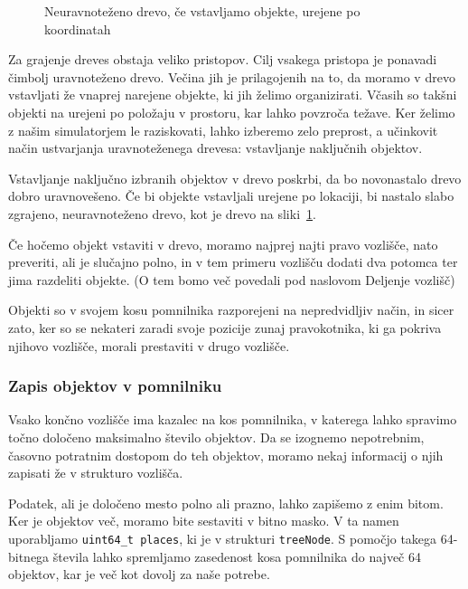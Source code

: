 \documentclass[a4paper,12pt]{article}
\begin{document}
\begin{figure}
    \centering
    
    \caption{Neuravnoteženo drevo, če vstavljamo objekte, urejene po koordinatah}%
    \label{fig:drevo_unbal}
\end{figure}

Za grajenje dreves obstaja veliko pristopov. Cilj vsakega pristopa je ponavadi čimbolj
uravnoteženo drevo. Večina jih je prilagojenih na to, da moramo v drevo vstavljati že vnaprej
narejene objekte, ki jih želimo organizirati. Včasih so takšni objekti na urejeni po položaju v prostoru,
kar lahko povzroča težave. Ker želimo z našim simulatorjem le raziskovati, lahko izberemo zelo 
preprost, a učinkovit način ustvarjanja uravnoteženega drevesa: vstavljanje naključnih objektov.

Vstavljanje naključno izbranih objektov v drevo poskrbi, da bo novonastalo drevo dobro uravnovešeno.
Če bi objekte vstavljali urejene po lokaciji, bi nastalo slabo zgrajeno, neuravnoteženo drevo, kot je
drevo na sliki~\ref{fig:drevo_unbal}.



Če hočemo objekt vstaviti v drevo, moramo najprej najti pravo vozlišče, nato preveriti,
ali je slučajno polno, in v tem primeru vozlišču dodati dva potomca ter jima razdeliti objekte.
(O tem bomo več povedali pod naslovom Deljenje vozlišč)

Objekti so v svojem kosu pomnilnika razporejeni na nepredvidljiv način, in sicer zato, ker so se nekateri
zaradi svoje pozicije zunaj pravokotnika, ki ga pokriva njihovo vozlišče, morali prestaviti v drugo vozlišče.

\subsubsection{Zapis objektov v pomnilniku}
Vsako končno vozlišče ima kazalec na kos pomnilnika, v katerega lahko spravimo
točno določeno maksimalno število objektov. Da se izognemo nepotrebnim, časovno potratnim dostopom
do teh objektov, moramo nekaj informacij o njih zapisati že v strukturo vozlišča.

Podatek, ali je določeno mesto polno ali prazno, lahko zapišemo z enim bitom. Ker je objektov več,
moramo bite sestaviti v bitno masko. V ta namen uporabljamo \lstinline|uint64_t places|, ki je v strukturi 
\lstinline|treeNode|. S pomočjo takega 64-bitnega števila lahko spremljamo zasedenost kosa pomnilnika 
do največ 64 objektov, kar je več kot dovolj za naše potrebe.
\end{document}
